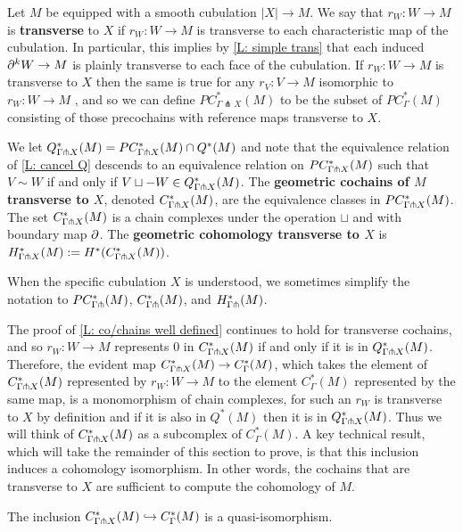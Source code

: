 \begin{definition}
Let $M$ be equipped with a smooth cubulation $|X| \to M$. We say that $r_W:W\to M$ is \textbf{transverse} to $X$ if $r_W: W\to M$ is transverse to each characteristic map of the cubulation. In particular, this implies by \cref{L: simple trans} that each induced $\partial^kW\to M$ is plainly transverse to each face of the cubulation. If $r_W:W\to M$ is transverse to $X$ then the same is true for any $r_V:V\to M$ isomorphic to $r_W:W\to M$ , and so we can define $PC^*_{\Gamma \pitchfork X}(M)$ to be the subset of $PC^*_{\Gamma}(M)$ consisting of those precochains with reference maps transverse to $X$.

We let $Q^*_{\Gamma \pitchfork X}(M)=PC_{\Gamma\pitchfork X}^*(M)\cap Q^*(M)$ and note that the equivalence relation of \cref{L: cancel Q} descends to an equivalence relation on  $PC_{\Gamma\pitchfork X}^*(M)$ such that $V\sim W$ if and only if $V\sqcup -W\in Q^*_{\Gamma \pitchfork X}(M)$. The \textbf{geometric cochains of $M$ transverse to $X$}, denoted $C_{\Gamma\pitchfork X}^*(M)$, are the equivalence classes in $PC_{\Gamma\pitchfork X}^*(M)$. The set $C_{\Gamma\pitchfork X}^*(M)$ is a chain complexes under the operation $\sqcup$ and with boundary map $\partial$. The \textbf{geometric cohomology transverse to $X$} is $H_{\Gamma\pitchfork X}^*(M):=H^*(C_{\Gamma\pitchfork X}^*(M))$.

When the specific cubulation $X$ is understood, we sometimes simplify the notation to $PC_{\Gamma\pitchfork}^*(M)$, $C_{\Gamma\pitchfork}^*(M)$, and $H_{\Gamma\pitchfork}^*(M)$.
\end{definition}


The proof of \cref{L: co/chains well defined} continues to hold for transverse cochains, and so $r_W:W\to M$ represents $0$ in $C^*_{\Gamma\pitchfork X}(M)$ if and only if it is in $Q^*_{\Gamma \pitchfork X}(M)$. Therefore, the evident map $C^*_{\Gamma\pitchfork X}(M)\to C^*_\Gamma(M)$, which takes the element of $C^*_{\Gamma\pitchfork X}(M)$ represented by $r_W:W\to M$ to the element $C^*_\Gamma(M)$ represented by the same map, is a monomorphism of chain complexes, for such an $r_W$ is transverse to $X$ by definition and if it is also in $Q^*(M)$ then it is  in $Q^*_{\Gamma \pitchfork X}(M)$. Thus we will think of  $C^*_{\Gamma\pitchfork X}(M)$ as a subcomplex of $C^*_\Gamma(M)$.
A key technical result, which will take the remainder of this section to prove,
is that this inclusion induces a cohomology isomorphism. In other words, the cochains that are transverse to $X$ are sufficient to compute the cohomology of $M$.

\begin{theorem} \label{T: transverse complex}
The inclusion $C^*_{\Gamma \pitchfork X}(M)\hookrightarrow C^*_\Gamma(M)$ is a quasi-isomorphism.
\end{theorem}


